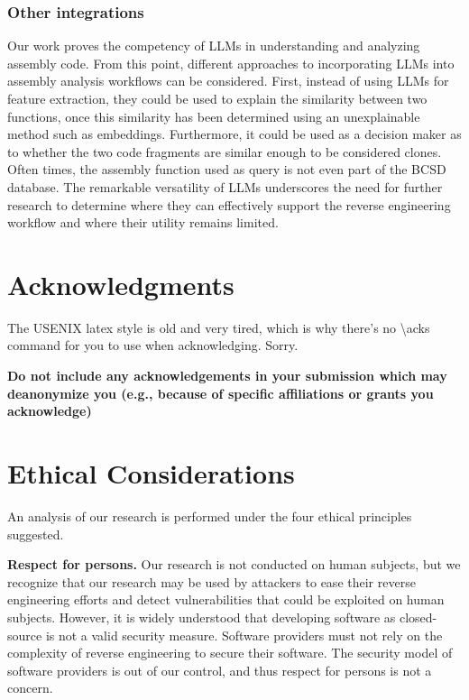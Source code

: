 \subsubsection{Other integrations}

Our work proves the competency of LLMs in understanding and analyzing assembly code. From this point, different approaches
to incorporating LLMs into assembly analysis workflows can be considered. First, instead of using LLMs for feature extraction,
they could be used to explain the similarity between two functions, once this similarity has been determined using an unexplainable
method such as embeddings. Furthermore, it could be used as a decision maker as to whether the two code fragments are similar enough
to be considered clones. Often times, the assembly function used as query is not even part of the BCSD database. The remarkable versatility
of LLMs underscores the need for further research to determine where they can effectively support the reverse engineering workflow and where
their utility remains limited.

\section*{Acknowledgments}

The USENIX latex style is old and very tired, which is why
there's no \textbackslash{}acks command for you to use when
acknowledging. Sorry.

\textbf{Do not include any acknowledgements in your submission which may deanonymize you (e.g., because of specific affiliations or grants you acknowledge)}

\cleardoublepage
\appendix
\section*{Ethical Considerations}

An analysis of our research is performed under the four ethical principles suggested.

\textbf{Respect for persons.} Our research is not conducted on human subjects, but we recognize that our research may be used by attackers to ease
their reverse engineering efforts and detect vulnerabilities that could be exploited on human subjects.  However, it is widely understood that
developing software as closed-source is not a valid security measure. Software providers must not rely on the complexity of reverse engineering to
secure their software. The security model of software providers is out of our control, and thus respect for persons is not a concern.

